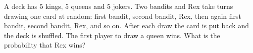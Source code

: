 A deck has $5$ kings, $5$ queens and $5$ jokers. Two bandits and Rex take turns drawing one card at random: first bandit, second bandit, Rex, then again first bandit, second bandit, Rex, and so on. After each draw the card is put back and the deck is shuffled. The first player to draw a queen wins. What is the probability that Rex wins?
